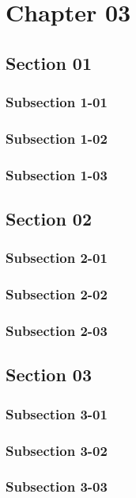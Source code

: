\chapter{Chapter 03}
\thispagestyle{empty}

\bt

\section{Section 01}
\bt
\subsection{Subsection 1-01}
\bt
\subsection{Subsection 1-02}
\bt
\subsection{Subsection 1-03}
\bt

\section{Section 02}
\bt
\subsection{Subsection 2-01}
\bt
\subsection{Subsection 2-02}
\bt
\subsection{Subsection 2-03}
\bt

\section{Section 03}
\bt
\subsection{Subsection 3-01}
\bt
\subsection{Subsection 3-02}
\bt
\subsection{Subsection 3-03}
\bt
